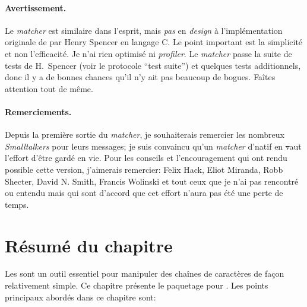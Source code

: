 \documentclass[a4paper,10pt,twoside]{book}
\begin{document}
{\paragraph{Avertissement.} Le \emph{matcher} est similaire dans
l'esprit, mais \emph{pas} en \emph{design}
à l'implémentation originale de \expreg par Henry Spencer en langage
C. Le point important est la simplicité et non l'efficacité. Je n'ai
rien optimisé ni \emph{profiler}.
Le \emph{matcher} passe la suite de tests de H.~Spencer (voir le
protocole ``test suite'') et quelques tests additionnels, donc il y a
de bonnes chances qu'il n'y ait pas beaucoup de bogues. Faîtes
attention tout de même. 

\paragraph{Remerciements.}
Depuis la première sortie du \emph{matcher}, je souhaiterais remercier
les nombreux \emph{Smalltalkers} pour leurs messages; je suis
convaincu qu'un \emph{matcher} d'\expreg natif en \st vaut l'effort 
d'être gardé en vie. Pour les conseils et l'encouragement qui ont rendu
possible cette version, j'aimerais remercier:
Felix Hack, Eliot Miranda, Robb Shecter, David N. Smith, Francis
Wolinski et tout ceux que je n'ai pas rencontré ou entendu mais qui sont
d'accord que cet effort n'aura pas été une perte de temps.

\section{Résumé du chapitre}

Les \expregs sont un outil essentiel pour manipuler des chaînes de
caractères de façon relativement simple.
Ce chapitre présente le paquetage \pkgregex pour \pharo. Les points
principaux abordés dans ce chapitre sont:

}
\end{document}

